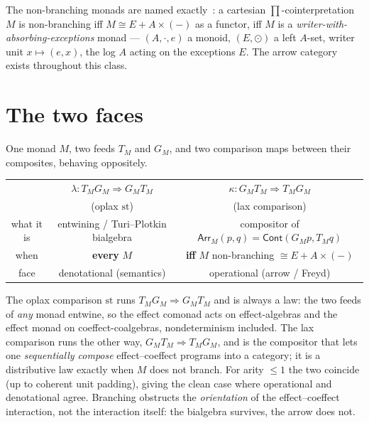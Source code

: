 \documentclass[11pt]{article}
\theoremstyle{plain}
\theoremstyle{definition}
\theoremstyle{remark}
\newcommand{\Cont}{\mathsf{Cont}}
\newcommand{\str}{\mathrm{st}}
\newcommand{\Arr}{\mathsf{Arr}}
\begin{document}
The non-branching monads are named exactly~\cite{MacBethArrows}: a cartesian
$\prod$-cointerpretation $M$ is non-branching iff $M\cong E+A\times(-)$ as a functor, iff
$M$ is a \emph{writer-with-absorbing-exceptions} monad --- $(A,\cdot,e)$ a monoid,
$(E,\odot)$ a left $A$-set, writer unit $x\mapsto(e,x)$, the log $A$ acting on the
exceptions $E$. The arrow category exists throughout this class.

\section{The two faces}

One monad $M$, two feeds $T_M$ and $G_M$, and two comparison maps between their
composites, behaving oppositely.

\begin{center}\small
  \renewcommand{\arraystretch}{1.5}\setlength{\tabcolsep}{6pt}
  \begin{tabular}{c|c|c}
    & $\lambda\colon T_M G_M\Rightarrow G_M T_M$ & $\kappa\colon G_M T_M\Rightarrow T_M G_M$\\
    & (oplax $\str$) & (lax comparison)\\\hline
    what it is & entwining / Turi--Plotkin bialgebra & compositor of $\Arr_M(p,q)=\Cont(G_M p,T_M q)$\\
    when & \textbf{every} $M$ & \textbf{iff} $M$ non-branching $\cong E+A\times(-)$\\
    face & denotational (semantics) & operational (arrow / Freyd)
  \end{tabular}
\end{center}

The oplax comparison $\str$ runs $T_M G_M\Rightarrow G_M T_M$ and is always a law: the
two feeds of \emph{any} monad entwine, so the effect comonad acts on effect-algebras
and the effect monad on coeffect-coalgebras, nondeterminism included. The lax comparison
runs the other way, $G_M T_M\Rightarrow T_M G_M$, and is the compositor that lets one
\emph{sequentially compose} effect--coeffect programs into a category; it is a
distributive law exactly when $M$ does not branch. For arity $\le1$ the two coincide (up
to coherent unit padding), giving the clean case where operational and denotational
agree. Branching obstructs the \emph{orientation} of the effect--coeffect interaction,
not the interaction itself: the bialgebra survives, the arrow does not.
\end{document}
